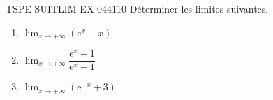 \begin{exercice}{TSPE-SUITLIM-EX-044}{1}{10}
Déterminer les limites suivantes.
\begin{enumerate}
  \item $\lim_{x \to +\infty} (\mathrm{e}^x - x)$
  \item $\lim_{x \to +\infty} \dfrac{\mathrm{e}^x + 1}{\mathrm{e}^x - 1}$
  \item $\lim_{x \to +\infty} (\mathrm{e}^{-x} + 3)$
\end{enumerate}
\end{exercice}
